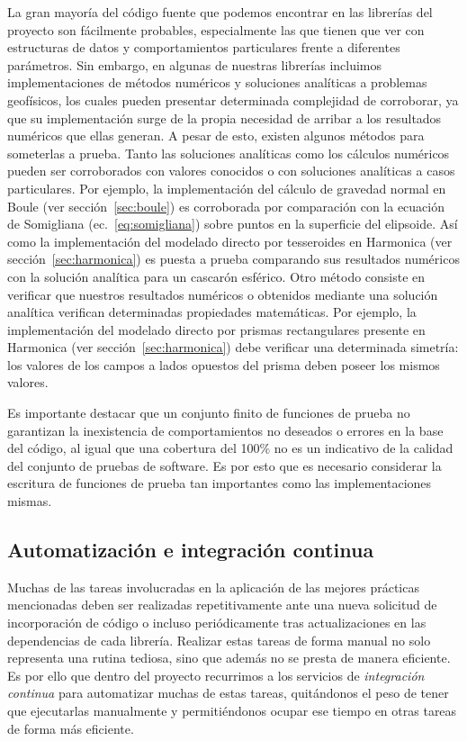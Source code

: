 La gran mayoría del código fuente que podemos encontrar en las librerías del
proyecto son fácilmente probables, especialmente las que tienen que ver con
estructuras de datos y comportamientos particulares frente a diferentes
parámetros.
Sin embargo, en algunas de nuestras librerías incluimos implementaciones de
métodos numéricos y soluciones analíticas a problemas geofísicos, los cuales
pueden presentar determinada complejidad de corroborar, ya que su
implementación surge de la propia necesidad de arribar a los resultados
numéricos que ellas generan.
A pesar de esto, existen algunos métodos para someterlas a prueba.
Tanto las soluciones analíticas como los cálculos numéricos pueden ser
corroborados con valores conocidos o con soluciones analíticas a casos
particulares.
Por ejemplo, la implementación del cálculo de gravedad normal en Boule (ver
sección~\ref{sec:boule}) es corroborada por comparación con la ecuación de
Somigliana (ec.~\ref{eq:somigliana}) sobre puntos en la superficie del
elipsoide.
Así como la implementación del modelado directo por tesseroides en Harmonica
(ver sección~\ref{sec:harmonica}) es puesta a prueba comparando sus resultados
numéricos con la solución analítica para un cascarón esférico.
Otro método consiste en verificar que nuestros resultados numéricos o obtenidos
mediante una solución analítica verifican determinadas propiedades matemáticas.
Por ejemplo, la implementación del modelado directo por prismas rectangulares
presente en Harmonica (ver sección~\ref{sec:harmonica}) debe verificar una
determinada simetría: los valores de los campos a lados opuestos del prisma
deben poseer los mismos valores.

Es importante destacar que un conjunto finito de funciones de prueba no
garantizan la inexistencia de comportamientos no deseados o errores en la base
del código, al igual que una cobertura del 100\% no es un indicativo de la
calidad del conjunto de pruebas de software.
Es por esto que es necesario considerar la escritura de funciones de prueba tan
importantes como las implementaciones mismas.


\subsection{Automatización e integración continua}
\label{sec:ci}

Muchas de las tareas involucradas en la aplicación de las mejores prácticas
mencionadas deben ser realizadas repetitivamente ante una nueva solicitud de
incorporación de código o incluso periódicamente tras actualizaciones en las
dependencias de cada librería.
Realizar estas tareas de forma manual no solo representa una rutina tediosa,
sino que además no se presta de manera eficiente.
Es por ello que dentro del proyecto recurrimos a los servicios de
\emph{integración continua} para automatizar muchas de estas tareas,
quitándonos el peso de tener que ejecutarlas manualmente y permitiéndonos
ocupar ese tiempo en otras tareas de forma más eficiente.

